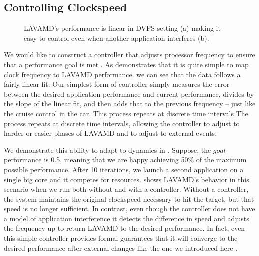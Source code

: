 \subsection{Controlling Clockspeed}
\begin{figure}
  \subfloat[]
  {
    
    \label{fig:lavamd_control}
  }
 \label{fig:freq-control}
 \caption{LAVAMD's performance is linear in DVFS setting (a) making it
   easy to control even when another application interferes (b).}
\end{figure}

We would like to construct a controller that adjusts processor
frequency to ensure that a performance goal is met
\cite{lefurgy2008power}.  As  demonstrates
that it is quite simple to map clock frequency to LAVAMD performance.
we can see that the data follows a fairly linear fit. Our simplest
form of controller simply measures the error between the desired
application performance and current performance, divides by the slope
of the linear fit, and then adds that to the previous frequency --
just like the cruise control in the car.  This process repeats at
discrete time intervals The process repeats at discrete time
intervals, allowing the controller to adjust to harder or easier
phases of LAVAMD and to adjust to external events.

We demonstrate this ability to adapt to dynamics in
.  Suppose, the $goal$ performance is 0.5,
meaning that we are happy achieving 50\% of the maximum possible
performance. After 10 iterations, we launch a second application on a
single big core and it competes for resources.
 shows LAVAMD's behavior in this scenario
when we run both without and with a controller.  Without a controller,
the system maintains the original clockspeed necessary to hit the
target, but that speed is no longer sufficient.  In contrast, even
though the controller does not have a model of application
interference it detects the difference in speed and adjusts the
frequency up to return LAVAMD to the desired performance. In fact,
even this simple controller provides formal guarantees that it will
converge to the desired performance after external changes like the
one we introduced here \cite{Hellerstein2004a}.

